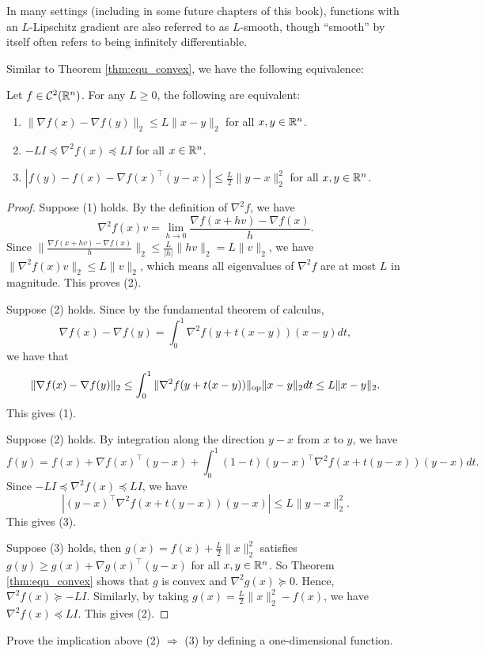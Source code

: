 In many settings (including in some future chapters of this book),
functions with an $L$-Lipschitz gradient are also referred to as
$L$-smooth, though ``smooth'' by itself often refers to being infinitely
differentiable. 

Similar to Theorem \ref{thm:equ_convex}, we have the following equivalence:
\begin{thm}
\label{thm:L_equ_def}Let $f\in\mathcal{C}^{2}(\mathbb{R}^{n})$. For any $L\geq0$,
the following are equivalent:
\begin{enumerate}
\item $\|\nabla f(x)-\nabla f(y)\|_{2}\leq L\|x-y\|_{2}$ for all $x,y\in\mathbb{R}^{n}$.
\item $-LI\preceq\nabla^{2}f(x)\preceq LI$ for all $x\in\mathbb{R}^{n}$.
\item $\left|f(y)-f(x)-\nabla f(x)^{\top}(y-x)\right|\le\frac{L}{2}\|y-x\|^{2}_{2}$
for all $x,y\in\mathbb{R}^{n}$.
\end{enumerate}
\end{thm}

\begin{proof}
Suppose (1) holds. By the definition of $\nabla^{2}f$, we have
\[
\nabla^{2}f(x)v=\lim_{h\rightarrow0}\frac{\nabla f(x+hv)-\nabla f(x)}{h}.
\]
Since $\|\frac{\nabla f(x+hv)-\nabla f(x)}{h}\|_{2}\leq\frac{L}{|h|}\|hv\|_{2}=L\|v\|_{2}$,
we have $\|\nabla^{2}f(x)v\|_{2}\leq L\|v\|_{2}$, which means all
eigenvalues of $\nabla^{2}f$ are at most $L$ in magnitude. This
proves (2).

Suppose (2) holds. Since by the fundamental theorem of calculus, 
\[
\nabla f(x)-\nabla f(y)=\int^{1}_{0}\nabla^{2}f(y+t(x-y))(x-y)dt,
\]
we have that
\[
\|\nabla f(x)-\nabla f(y)\|_{2}\leq\int^{1}_{0}\|\nabla^{2}f(y+t(x-y))\|_{\mathrm{op}}\|x-y\|_{2}dt\leq L\|x-y\|_{2}.
\]
This gives (1).

Suppose (2) holds. By integration along the direction $y-x$ from
$x$ to $y$, we have
\[
f(y)=f(x)+\nabla f(x)^{\top}(y-x)+\int^{1}_{0}(1-t)(y-x)^{\top}\nabla^{2}f(x+t(y-x))(y-x)dt.
\]
Since $-LI\preceq\nabla^{2}f(x)\preceq LI$, we have
\[
\left|(y-x)^{\top}\nabla^{2}f(x+t(y-x))(y-x)\right|\le L\|y-x\|^{2}_{2}.
\]
This gives (3).

Suppose (3) holds, then $g(x)=f(x)+\frac{L}{2}\|x\|^{2}_{2}$ satisfies
$g(y)\geq g(x)+\nabla g(x)^{\top}(y-x)$ for all $x,y\in\mathbb{R}^{n}$. So
Theorem \ref{thm:equ_convex} shows that $g$ is convex and $\nabla^{2}g(x)\succeq0$.
Hence, $\nabla^{2}f(x)\succeq-LI$. Similarly, by taking $g(x)=\frac{L}{2}\|x\|^{2}_{2}-f(x)$,
we have $\nabla^{2}f(x)\preceq LI$. This gives (2).
\end{proof}
\begin{xca}
Prove the implication above (2) $\Rightarrow$ (3) by defining a one-dimensional
function. 
\end{xca}

